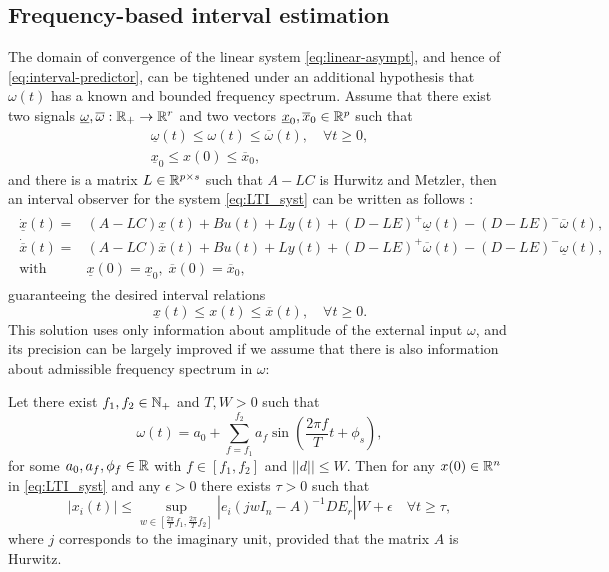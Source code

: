 \subsection{Frequency-based interval estimation}
\label{sec:Frequency}
The domain of convergence of the linear system \eqref{eq:linear-asympt}, and hence of \eqref{eq:interval-predictor}, can be tightened under an additional hypothesis that $\omega(t)$ has a known and bounded frequency spectrum.
Assume that there exist two signals $\underline{\omega},\overline{\omega}:\mathbb{R}_{+}\to\mathbb{R}^{r}$ and two vectors $\underline{x}_{0},\overline{x}_{0}\in\mathbb{R}^{p}$ such that
\begin{gather*}
\underline{\omega}(t)\leq \omega(t)\leq\overline{\omega}(t),\quad\forall t\geq0,\\
\underline{x}_{0}\leq x(0)\leq\overline{x}_{0},
\end{gather*} and there is a matrix $L\in\mathbb{R}^{p\times s}$ such that $A-LC$ is Hurwitz and Metzler, then an interval observer for the system \eqref{eq:LTI_syst} can be written as follows \citep{REZ11}:
\begin{align}
\label{eq:IO_LTI}
\begin{split}
\dot{\underline{x}}(t) = {} & (A-LC)\underline{x}(t)+Bu(t) +Ly(t)  +(D-LE)^{+}\underline{\omega}(t)-(D-LE)^{-}\overline{\omega}(t), \\
\dot{\overline{x}}(t) = {} & (A-LC)\overline{x}(t)+Bu(t) +Ly(t)  +(D-LE)^{+}\overline{\omega}(t)-(D-LE)^{-}\underline{\omega}(t), \\
 \text{with }\, & \underline{x}(0)=\underline{x}_{0},\;\overline{x}(0)=\overline{x}_{0}, 
\end{split}
\end{align}
guaranteeing the desired interval relations
\[
\underline{x}(t)\leq x(t)\leq\overline{x}(t),\quad\forall t\geq0.
\]
This solution uses only information about amplitude of the external input $\omega$, and its precision can be largely improved if we assume that there is also information about admissible frequency spectrum in $\omega$:
\begin{lemma}
	\label{lem:IntFreq}
	\begin{leftbar}[lemmabar]
	Let there exist $f_{1},f_{2}\in\mathbb{N}_{+}$ and $T,W>0$
	such that
	\[
	\omega(t)=a_{0}+\sum_{f=f_{1}}^{f_{2}}a_{f}\sin\left(\frac{2\pi f}{T}t+\phi_{s}\right),
	\]
	for some $a_{0},a_{f},\phi_{f}\in\mathbb{R}$ with $f\in[f_{1},f_{2}]$ and $||d||\leq W$. Then for any $x(0)\in\mathbb{R}^{n}$ in \eqref{eq:LTI_syst} and any $\epsilon>0$ there exists $\tau>0$ such that
	\[
	|x_{i}(t)|\leq\sup_{w\in[\frac{2\pi}{T}f_{1},\frac{2\pi}{T}f_{2}]}|e_{i}(jwI_{n}-A)^{-1}DE_{r}|W+\epsilon\quad\forall t\geq\tau,
	\]
	where $j$ corresponds to the imaginary unit, provided that the matrix $A$ is Hurwitz.
	\end{leftbar}
\end{lemma}
